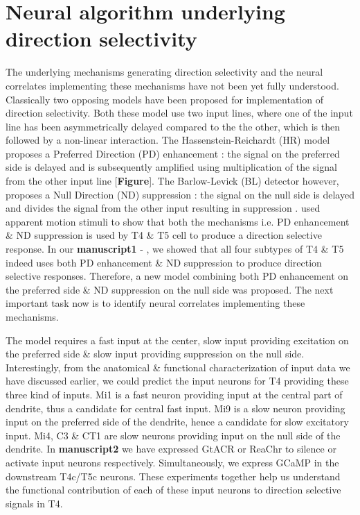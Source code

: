 \section{Neural algorithm underlying direction selectivity}
The underlying mechanisms generating direction selectivity and the neural correlates implementing these mechanisms have not been yet fully understood. Classically two opposing models have been proposed for implementation of direction selectivity. Both these model use two input lines, where one of the input line has been asymmetrically delayed compared to the the other, which is then followed by a non-linear interaction. The Hassenstein-Reichardt (HR) model proposes a Preferred Direction (PD) enhancement : the signal on the preferred side is delayed and is subsequently amplified using multiplication of the signal from the other input line [\textbf{Figure}]\parencite{Hassenstein1956}. The Barlow-Levick (BL) detector however, proposes a Null Direction (ND) suppression : the signal on the null side is delayed and divides the signal from the other input resulting in suppression \parencite{Barlow1965} . \cite{Haag2016a} used apparent motion stimuli to show that both the mechanisms i.e. PD enhancement \& ND suppression is used by T4 \& T5 cell to produce a direction selective response. In our \textbf{manuscript1} - \parencite{Haag2017}, we showed that all four subtypes of T4 \& T5 indeed uses both PD enhancement \& ND suppression to produce direction selective responses. Therefore, a new model combining both PD enhancement on the preferred side \& ND suppression on the null side was proposed. The next important task now is to identify neural correlates implementing these mechanisms. 

The model requires a fast input at the center, slow input providing excitation on the preferred side \& slow input providing suppression on the null side. Interestingly, from the anatomical \& functional characterization of input data we have discussed earlier, we could predict the input neurons for T4 providing these three kind of inputs. Mi1 is a fast neuron providing input at the central part of dendrite, thus a candidate for central fast input. Mi9 is a slow neuron providing input on the preferred side of the dendrite, hence a candidate for slow excitatory input. Mi4, C3 \& CT1 are slow neurons providing input on the null side of the dendrite. In \textbf{manuscript2} we have expressed GtACR or ReaChr to silence or activate input neurons respectively. Simultaneously, we express GCaMP in the downstream T4c/T5c neurons. These experiments together help us understand the functional contribution of each of these input neurons to direction selective signals in T4.




